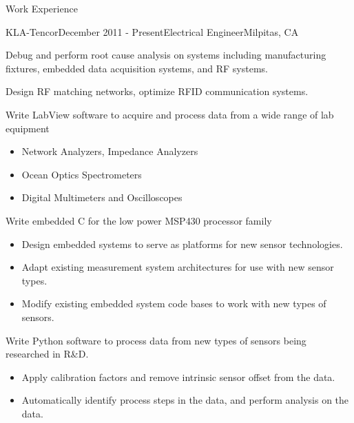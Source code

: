 \documentclass{resume} %
\begin{document}
\begin{rSection}{Work Experience}

\begin{rSubsection}{KLA-Tencor}{December 2011 - Present}{Electrical Engineer}{Milpitas, CA}
\smallskip
\item Debug and perform root cause analysis on systems including manufacturing fixtures, embedded data acquisition systems, and RF systems.
\item Design RF matching networks, optimize RFID communication systems.
\item Write LabView software to acquire and process data from a wide range of lab equipment
\begin{itemize}
\itemsep -0.5em \vspace{-0.5em}
\renewcommand{\labelitemi}{-}
\item Network Analyzers, Impedance Analyzers
\item Ocean Optics Spectrometers
\item Digital Multimeters and Oscilloscopes
\end{itemize}

\item Write embedded C for the low power MSP430 processor family
\begin{itemize}
\itemsep -0.5em \vspace{-0.5em}
\renewcommand{\labelitemi}{-}
\item Design embedded systems to serve as platforms for new sensor technologies.
\item Adapt existing measurement system architectures for use with new sensor types.
\item Modify existing embedded system code bases to work with new types of sensors. 
\end{itemize}

\item Write Python software to process data from new types of sensors being researched in R\&D.
\begin{itemize}
\itemsep -0.5em \vspace{-0.5em}
\renewcommand{\labelitemi}{-}
\item Apply calibration factors and remove intrinsic sensor offset from the data.
\item Automatically identify process steps in the data, and perform analysis on the data.
\end{itemize}


\end{rSubsection}
\end{rSection}
\end{document}
